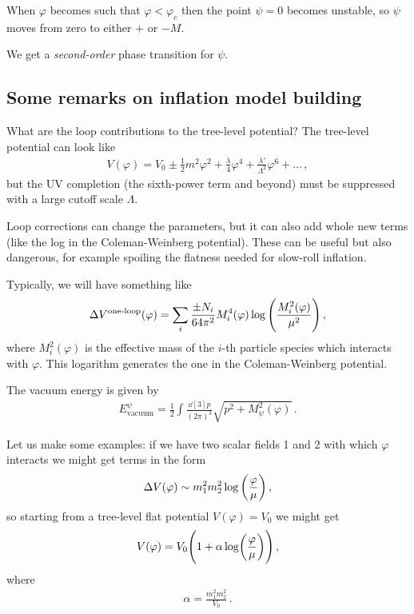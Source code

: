 \documentclass[main.tex]{subfiles}
\begin{document}
When \(\varphi \) becomes such that \(\varphi < \varphi _c\) then the point \(\psi = 0\) becomes unstable, so \(\psi \) moves from zero to either \(+\) or \(-M\).  

We get a \emph{second-order} phase transition for \(\psi \). 

\subsection{Some remarks on inflation model building}

What are the loop contributions to the tree-level potential?
The tree-level potential can look like 
%
\begin{align}
V(\varphi ) = V_0 \pm \frac{1}{2} m^2 \varphi^2 + \frac{\lambda}{4} \varphi^{4} + \frac{\lambda '}{\Lambda^2} \varphi^{6} + \dots
\,,
\end{align}
%
but the UV completion (the sixth-power term and beyond) must be suppressed with a large cutoff scale \(\Lambda \). 

Loop corrections can change the parameters, but it can also add whole new terms (like the log in the Coleman-Weinberg potential). 
These can be useful but also dangerous, for example spoiling the flatness needed for slow-roll inflation. 

Typically, we will have something like 
%
\begin{align}
\Delta V^{\text{one-loop}}(\varphi )
= \sum _{i} \frac{\pm N_i}{64 \pi^2}
M_i^{4} (\varphi ) \log \qty(\frac{M_i^2 (\varphi )}{\mu^2})
\,,
\end{align}
%
where \(M_i^2(\varphi )\) is the effective mass of the \(i\)-th particle species which interacts with \(\varphi \). 
This logarithm generates the one in the Coleman-Weinberg potential.

The vacuum energy is given by 
%
\begin{align}
E^{\psi } _{\text{vacuum}} = \frac{1}{2} \int  \frac{ \dd[3]{p}}{(2 \pi )^3}
\sqrt{p^2 + M^2_\psi (\varphi )}
\,.
\end{align}

Let us make some examples: if we have two scalar fields 1 and 2 with which \(\varphi \) interacts we might get terms in the form 
%
\begin{align}
\Delta V(\varphi ) \sim m_1^2 m_2^2 \log \qty( \frac{\varphi}{\mu })
\,,
\end{align}
%
so starting from a tree-level flat potential \(V(\varphi ) = V_0 \) we might get 
%
\begin{align}
V(\varphi ) = V_0 \qty(1 + \alpha  \log (\frac{\varphi }{\mu }))
\,,
\end{align}
%
where 
%
\begin{align}
\alpha = \frac{m_1^2 m_2^2}{V_0 }
\,.
\end{align}
%
\end{document}
